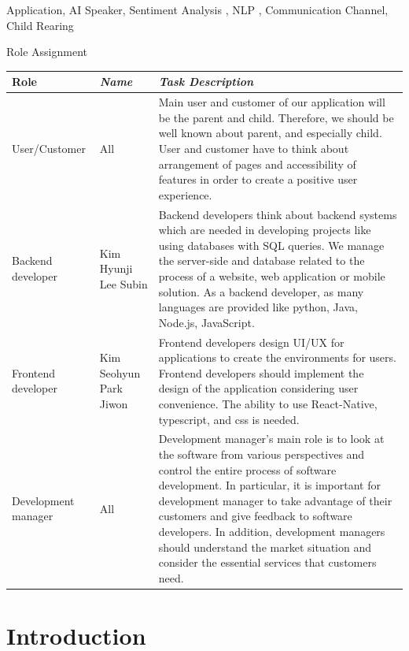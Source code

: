 \documentclass[conference]{IEEEtran}
\begin{document}
\begin{IEEEkeywords}
Application, AI Speaker, Sentiment Analysis , NLP , Communication Channel, Child Rearing
\end{IEEEkeywords}


\newpage
{\large{Role Assignment}}
{\renewcommand{\arraystretch}{1.5}%
\begin{table}[h!]
\begin{tabular}{ | p{} | p{} | p{} | }
\cline{1-3} 
\textbf{Role} & \textbf{\textit{Name}}& \textbf{\textit{Task Description}}\\
\hline
User/Customer&All&Main user and customer of our application will be the parent and child. Therefore, we should be well known about parent, and especially child. User and customer have to think about arrangement of pages and accessibility of features in order to create a positive user experience. \\
\hline
Backend developer&Kim Hyunji Lee Subin&Backend developers think about backend systems which are needed in developing projects like using databases with SQL queries. We manage the server-side and database related to the process of a website, web application or mobile solution. As a backend developer, as many languages are provided like python, Java, Node.js, JavaScript.\\
\hline
Frontend developer&Kim Seohyun Park Jiwon&Frontend developers design UI/UX for applications to create the environments for users. Frontend developers should implement the design of the application considering user convenience. The ability to use React-Native, typescript, and css is needed.\\
\hline
Development manager&All&Development manager’s main role is to look at the software from various perspectives and control the entire process of software development. In particular, it is important for development manager to take advantage of their customers and give feedback to software developers. In addition, development managers should understand the market situation and consider the essential services that customers need.\\
\hline
\end{tabular}
\end{table}}
\newpage


\section{\large{Introduction}}
\end{document}
